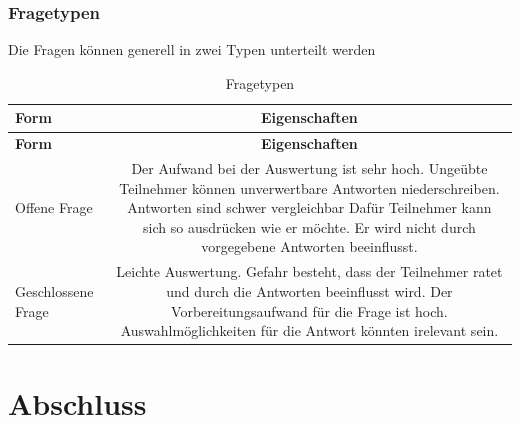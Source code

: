 \subsubsection{Fragetypen}\label{fragetypen}

Die Fragen können generell in zwei Typen unterteilt werden

\begin{longtable}[c]{@{}lc@{}}
\caption{Fragetypen}\tabularnewline
\toprule
\begin{minipage}[b]{0.24\columnwidth}\raggedright\strut
\textbf{Form}
\strut\end{minipage} &
\begin{minipage}[b]{0.70\columnwidth}\centering\strut
\textbf{Eigenschaften}
\strut\end{minipage}\tabularnewline
\midrule
\endfirsthead
\toprule
\begin{minipage}[b]{0.24\columnwidth}\raggedright\strut
\textbf{Form}
\strut\end{minipage} &
\begin{minipage}[b]{0.70\columnwidth}\centering\strut
\textbf{Eigenschaften}
\strut\end{minipage}\tabularnewline
\midrule
\endhead
\begin{minipage}[t]{0.24\columnwidth}\raggedright\strut
Offene Frage
\strut\end{minipage} &
\begin{minipage}[t]{0.70\columnwidth}\centering\strut
Der Aufwand bei der Auswertung ist sehr hoch. Ungeübte Teilnehmer können
unverwertbare Antworten niederschreiben. Antworten sind schwer
vergleichbar Dafür Teilnehmer kann sich so ausdrücken wie er möchte. Er
wird nicht durch vorgegebene Antworten beeinflusst.
\strut\end{minipage}\tabularnewline
\begin{minipage}[t]{0.24\columnwidth}\raggedright\strut
Geschlossene Frage
\strut\end{minipage} &
\begin{minipage}[t]{0.70\columnwidth}\centering\strut
Leichte Auswertung. Gefahr besteht, dass der Teilnehmer ratet und durch
die Antworten beeinflusst wird. Der Vorbereitungsaufwand für die Frage
ist hoch. Auswahlmöglichkeiten für die Antwort könnten irelevant sein.
\strut\end{minipage}\tabularnewline
\bottomrule
\end{longtable}

\section{Abschluss}\label{abschluss}

